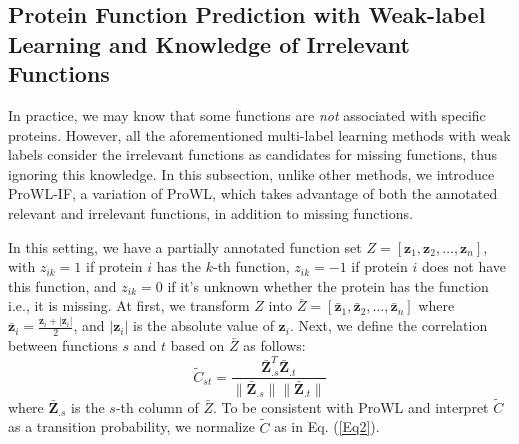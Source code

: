 \documentclass{llncs} %
\begin{document}
 \subsection{Protein Function Prediction with Weak-label Learning and Knowledge of Irrelevant Functions}
 In practice, we may know that some functions are \textit{not} associated with specific proteins. However, all the aforementioned multi-label learning methods with weak labels \cite{bucak2011multi,qi2011mining,sun2010multi} consider the irrelevant functions as candidates for missing functions, thus ignoring this knowledge. In this subsection, unlike other methods, we introduce ProWL-IF, a variation of ProWL, which takes advantage of both the annotated relevant and irrelevant functions, in addition to missing functions.

 In this setting, we have a partially annotated function set $Z=[\mathbf{z}_1,\mathbf{z}_2,\ldots,\mathbf{z}_n]$, with $z_{ik}=1$ if protein $i$ has the $k$-th function, $z_{ik}=-1$ if protein $i$ does not have this function, and $z_{ik}=0$ if it's unknown whether the protein has the function i.e., it is missing. At first, we transform $Z$ into $\bar{Z}=[\bar{\mathbf{z}}_1,\bar{\mathbf{z}}_2,\ldots,\bar{\mathbf{z}}_n]$ where $\bar{\mathbf{z}}_{i}=\frac{\mathbf{z}_{i}+|\mathbf{z}_{i}|}{2}$, and $|\mathbf{z}_{i}|$ is the absolute value of $\mathbf{z}_{i}$. Next, we define the correlation between functions $s$ and $t$ based on $\bar{Z}$ as follows:
 \begin{equation}
 \tilde{C}_{st}=\frac{\bar{\mathbf{Z}}_{.s}^{T}\bar{\mathbf{Z}}_{.t}}{\|\bar{\mathbf{Z}}_{.s}\|\|\bar{\mathbf{Z}}_{.t}\|}
 \label{Eq10}
 \end{equation}
 where $\bar{\mathbf{Z}}_{.s}$ is the $s$-th column of $\bar{Z}$. To be consistent with ProWL and interpret $\tilde{C}$ as a transition probability, we normalize $\tilde{C}$ as in Eq. (\ref{Eq2}).
\end{document}
